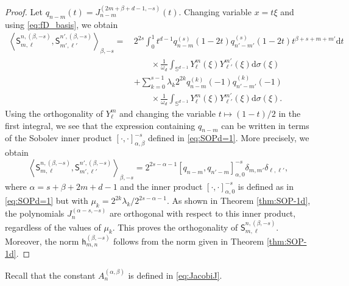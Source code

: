 \documentclass{amsart}
\theoremstyle{remark}
\newtheorem{rem}{Remark}[section]\newtheorem*{notation}{Notation}
\def\la{{\langle}}
\def\ra{{\rangle}}
\def\d{\mathrm{d}}
\def\sh{{\mathsf h}}
\def\sm{{\mathsf m}}
\def\sS{{\mathsf S}}
\def\a{{\alpha}}
\def\b{{\beta}}
\def\l{{\lambda}}
\def\o{{\omega}}
\def\s{\sigma}
\def\la{{\langle}}
\def\ra{{\rangle}}
\def\SS{{\mathbb S}}
\def\VV{{\mathbb V}}
\begin{document}
\begin{proof}
Let $q_{n-m}(t) = J_{n-m}^{(2m+\b+d-1, -s)}(t)$. Changing variable $x = t \xi$ and using \eqref{eq:fD_basis}, we obtain
\begin{align*}
 \left \langle \sS_{m,\ell}^{n,(\b,-s)}, \sS_{m',\ell'}^{n',(\b,-s)} \right \rangle_{\b,-s}
  = \, & 2^{ 2s}  \int_0^1 t^{d-1} q_{n-m}^{(s)} (1-2t) q_{n'-m'}^{(s)}(1-2t) t^{\b+s+m+m'} \d t \\
 &\qquad \times  \frac{1}{\o_d} \int_{\SS^{d-1}}  Y_\ell^m (\xi)Y_{\ell'}^{m'} (\xi) \d \s (\xi) \\
 & + \sum_{k=0}^{s-1} \l_k 2^{2k} q_{n-m}^{(k)}(-1) q_{n'-m'}^{(k)}(-1)  \\
 &\qquad \times  \frac{1}{\o_d} \int_{\SS^{d-1}}    Y_\ell^m (\xi)Y_{\ell'}^{m'} (\xi) \d \s (\xi).
\end{align*}
Using the orthogonality of $Y_\ell^m$ and changing the variable $t \mapsto (1-t)/2$ in the first integral, we
see that the expression containing $q_{n-m}$ can be written in terms of the Sobolev inner product
$[\cdot,\cdot]_{\a,\b}^{-s}$ defined in \eqref{eq:SOPd=1}. More precisely, we obtain
$$
\left \langle \sS_{m,\ell}^{n,(\b,-s)},  \sS_{m',\ell'}^{n',(\b,-s)} \right \rangle_{\b,-s} =
   2^{2 s - \a-1} [q_{n-m}, q_{n'-m}]_{\a,0}^{-s} \delta_{m,m'} \delta_{\ell,\ell'},
$$
where $\a = s+\b+2m+d-1$ and the inner product $[\cdot, \cdot]_{\a,0}^{-s}$ is defined as in \eqref{eq:SOPd=1}
but with $\mu_k = 2^{2k} \l_k/2^{2 s-\a-1}$. As shown in Theorem \ref{thm:SOP-1d}, the polynomials $J_n^{(\a-s,-s)}$
are orthogonal with respect to this inner product, regardless of the values of $\mu_k$. This
proves the orthogonality of $\sS_{m,\ell}^{n,(\b,-s)}$. Moreover,  the norm $\sh_{m,n}^{(\b,-s)}$ follows
from the norm given in Theorem \ref{thm:SOP-1d}.
\end{proof}

Recall that the constant $A_n^{(\a,\b)}$ is defined in \eqref{eq:JacobiJ}.
\end{document}
